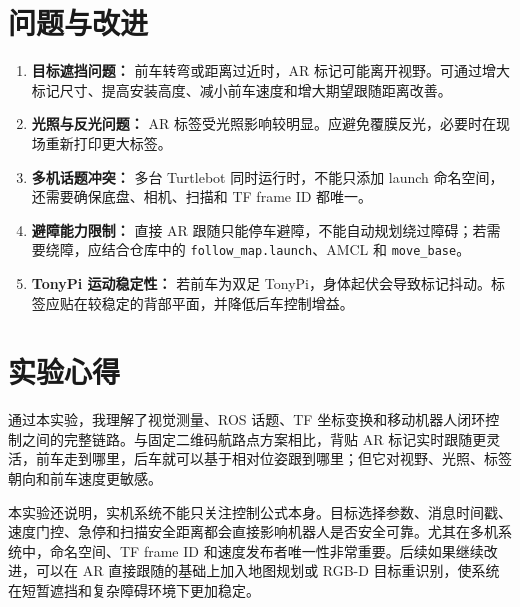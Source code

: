 \documentclass[UTF8,a4paper,12pt]{ctexart}
\begin{document}
	\section{问题与改进}
	\begin{enumerate}
		\item \textbf{目标遮挡问题：} 前车转弯或距离过近时，AR 标记可能离开视野。可通过增大标记尺寸、提高安装高度、减小前车速度和增大期望跟随距离改善。
		\item \textbf{光照与反光问题：} AR 标签受光照影响较明显。应避免覆膜反光，必要时在现场重新打印更大标签。
		\item \textbf{多机话题冲突：} 多台 Turtlebot 同时运行时，不能只添加 launch 命名空间，还需要确保底盘、相机、扫描和 TF frame ID 都唯一。
		\item \textbf{避障能力限制：} 直接 AR 跟随只能停车避障，不能自动规划绕过障碍；若需要绕障，应结合仓库中的 \texttt{follow\_map.launch}、AMCL 和 \texttt{move\_base}。
		\item \textbf{TonyPi 运动稳定性：} 若前车为双足 TonyPi，身体起伏会导致标记抖动。标签应贴在较稳定的背部平面，并降低后车控制增益。
	\end{enumerate}

	\section{实验心得}
	通过本实验，我理解了视觉测量、ROS 话题、TF 坐标变换和移动机器人闭环控制之间的完整链路。与固定二维码航路点方案相比，背贴 AR 标记实时跟随更灵活，前车走到哪里，后车就可以基于相对位姿跟到哪里；但它对视野、光照、标签朝向和前车速度更敏感。

	本实验还说明，实机系统不能只关注控制公式本身。目标选择参数、消息时间戳、速度门控、急停和扫描安全距离都会直接影响机器人是否安全可靠。尤其在多机系统中，命名空间、TF frame ID 和速度发布者唯一性非常重要。后续如果继续改进，可以在 AR 直接跟随的基础上加入地图规划或 RGB-D 目标重识别，使系统在短暂遮挡和复杂障碍环境下更加稳定。
\end{document}
